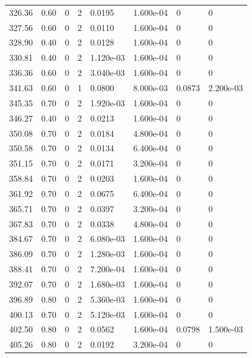 \documentclass[preview]{standalone}
\begin{document}
{{{\begin{tabular}{L{1.2cm}C{1.2cm} C{0.3cm}C{0.5cm} C{1.4cm}C{1.4cm} C{1.4cm}C{1.4cm}}
  326.36  &  0.60  & 0     &  2 &  0.0195  & 1.600e-04  & 0 &  0   \\ 
  327.56  &  0.60  & 0     &  2 &  0.0110  & 1.600e-04  & 0 &  0   \\ 
  328.90  &  0.40  & 0     &  2 &  0.0128  & 1.600e-04  & 0 &  0   \\ 
  330.81  &  0.40  & 0     &  2 &  1.120e-03  & 1.600e-04  & 0 &  0   \\ 
  336.36  &  0.60  & 0     &  2 &  3.040e-03  & 1.600e-04  & 0 &  0   \\ 
  341.63  &  0.60  & 0     &  1 &  0.0800  & 8.000e-03  & 0.0873 &  2.200e-03   \\ 
  345.35  &  0.70  & 0     &  2 &  1.920e-03  & 1.600e-04  & 0 &  0   \\ 
  346.27  &  0.40  & 0     &  2 &  0.0213  & 1.600e-04  & 0 &  0   \\ 
  350.08  &  0.70  & 0     &  2 &  0.0184  & 4.800e-04  & 0 &  0   \\ 
  350.58  &  0.70  & 0     &  2 &  0.0134  & 6.400e-04  & 0 &  0   \\ 
  351.15  &  0.70  & 0     &  2 &  0.0171  & 3.200e-04  & 0 &  0   \\ 
  358.84  &  0.70  & 0     &  2 &  0.0203  & 1.600e-04  & 0 &  0   \\ 
  361.92  &  0.70  & 0     &  2 &  0.0675  & 6.400e-04  & 0 &  0   \\ 
  365.71  &  0.70  & 0     &  2 &  0.0397  & 3.200e-04  & 0 &  0   \\ 
  367.83  &  0.70  & 0     &  2 &  0.0338  & 4.800e-04  & 0 &  0   \\ 
  384.67  &  0.70  & 0     &  2 &  6.080e-03  & 1.600e-04  & 0 &  0   \\ 
  386.09  &  0.70  & 0     &  2 &  1.280e-03  & 1.600e-04  & 0 &  0   \\ 
  388.41  &  0.70  & 0     &  2 &  7.200e-04  & 1.600e-04  & 0 &  0   \\ 
  392.07  &  0.70  & 0     &  2 &  1.680e-03  & 1.600e-04  & 0 &  0   \\ 
  396.89  &  0.80  & 0     &  2 &  5.360e-03  & 1.600e-04  & 0 &  0   \\ 
  400.13  &  0.70  & 0     &  2 &  5.120e-03  & 1.600e-04  & 0 &  0   \\ 
  402.50  &  0.80  & 0     &  2 &  0.0562  & 1.600e-04  & 0.0798 &  1.500e-03   \\ 
  405.26  &  0.80  & 0     &  2 &  0.0192  & 3.200e-04  & 0 &  0   \\ 

\end{tabular}}}}
\end{document}
